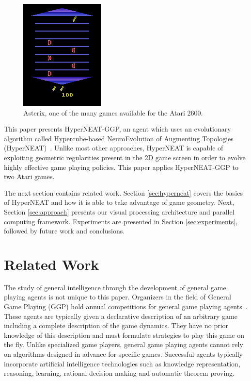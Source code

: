 \documentclass{acm_proc_article-sp}
\begin{document}
\begin{figure}[t]
\begin{center}
\includegraphics[width=.5\columnwidth]{figures/asterix.png}
\end{center}
\caption{Asterix, one of the many games available for the Atari 2600.}
\label{fig:asterix}
\end{figure}

This paper presents HyperNEAT-GGP, an agent which uses an evolutionary algorithm called Hypercube-based NeuroEvolution of Augmenting Topologies (HyperNEAT)~\cite{gauci08}. Unlike most other approaches, HyperNEAT is capable of exploiting geometric regularities present in the 2D game screen in order to evolve highly effective game playing policies. This paper applies HyperNEAT-GGP to two Atari games.

The next section contains related work. Section \ref{sec:hyperneat} covers the basics of HyperNEAT and how it is able to take advantage of game geometry. Next, Section \ref{sec:approach} presents our visual processing architecture and parallel computing framework. Experiments are presented in Section \ref{sec:experiments}, followed by future work and conclusions.

\section{Related Work}
\label{sec:background}
The study of general intelligence through the development of general game playing agents is not unique to this paper. Organizers in the field of General Game Playing (GGP) hold annual competitions for general game playing agents~\cite{genesereth05}. These agents are typically given a declarative description of an arbitrary game including a complete description of the game dynamics. They have no prior knowledge of this description and must formulate strategies to play this game on the fly. Unlike specialized game players, general game playing agents cannot rely on algorithms designed in advance for specific games. Successful agents typically incorporate artificial intelligence technologies such as knowledge representation, reasoning, learning, rational decision making and automatic theorem proving. 
\end{document}
